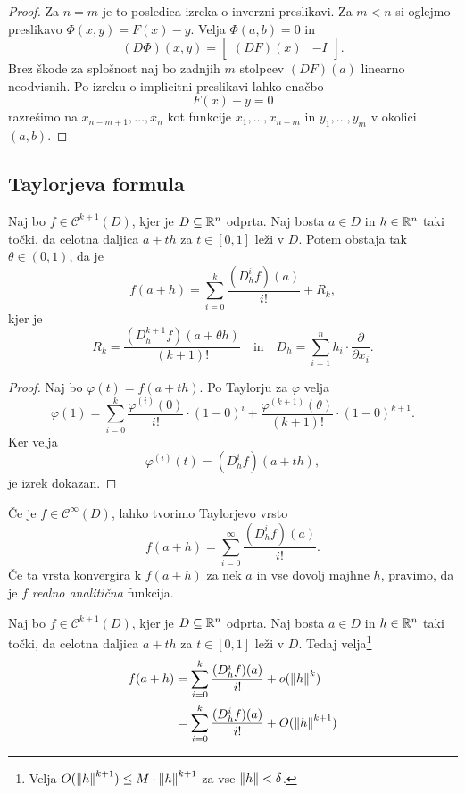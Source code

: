 \begin{proof}
Za $n=m$ je to posledica izreka o inverzni preslikavi. Za $m < n$
si oglejmo preslikavo $\Phi(x,y) = F(x) - y$. Velja $\Phi(a,b)=0$
in
\[
(D\Phi)(x,y) =
\begin{bmatrix}
(DF)(x) & -I
\end{bmatrix}.
\]
Brez škode za splošnost naj bo zadnjih $m$ stolpcev $(DF)(a)$
linearno neodvisnih. Po izreku o implicitni preslikavi lahko enačbo
\[
F(x) - y = 0
\]
razrešimo na $x_{n-m+1},\dots,x_n$ kot funkcije $x_1,\dots,x_{n-m}$
in $y_1,\dots,y_m$ v okolici $(a,b)$.
\end{proof}

\newpage

\subsection{Taylorjeva formula}

\begin{izrek}
Naj bo $f \in \mathcal{C}^{k+1}(D)$, kjer je $D \subseteq \mathbb{R}^n$
odprta. Naj bosta $a \in D$ in $h \in \mathbb{R}^n$ taki točki, da celotna
daljica $a+th$ za $t \in [0,1]$ leži v $D$. Potem obstaja tak
$\theta \in (0,1)$, da je
\[
f(a+h) = \sum_{i=0}^k \frac{(D_h^if)(a)}{i!} + R_k,
\]
kjer je
\[
R_k = \frac{(D_h^{k+1}f)(a + \theta h)}{(k+1)!}
\quad \text{in} \quad
D_h = \sum_{i=1}^n h_i \cdot \frac{\partial}{\partial x_i}.
\]
\end{izrek}

\begin{proof}
Naj bo $\varphi(t) = f(a + th)$. Po Taylorju za $\varphi$ velja
\[
\varphi(1) = \sum_{i=0}^k \frac{\varphi^{(i)}(0)}{i!} \cdot(1-0)^i
+ \frac{\varphi^{(k+1)}(\theta)}{(k+1)!} \cdot (1-0)^{k+1}.
\]
Ker velja
\[
\varphi^{(i)}(t) = (D_h^if)(a+th),
\]
je izrek dokazan.
\end{proof}

\begin{opomba}
Če je $f \in \mathcal{C}^\infty(D)$, lahko tvorimo Taylorjevo vrsto
\[
f(a+h) = \sum_{i=0}^\infty \frac{(D_h^if)(a)}{i!}.
\]
Če ta vrsta konvergira k $f(a+h)$ za nek $a$ in vse dovolj majhne
$h$, pravimo, da je $f$
\emph{realno analitična} funkcija.
\end{opomba}

\begin{posledica}
Naj bo $f \in \mathcal{C}^{k+1}(D)$, kjer je $D \subseteq \mathbb{R}^n$
odprta. Naj bosta $a \in D$ in $h \in \mathbb{R}^n$ taki točki, da celotna
daljica $a+th$ za $t \in [0,1]$ leži v $D$. Tedaj velja\footnote{
Velja $O(\left\lVert h\right\rVert^{k+1}) \leq M \cdot \left\lVert h\right\rVert^{k+1}$ za vse
$\left\lVert h\right\rVert < \delta$.}
\begin{align*}
f(a+h) &= \sum_{i=0}^k \frac{(D_h^if)(a)}{i!} + o(\left\lVert h\right\rVert^k)
\\
&= \sum_{i=0}^k \frac{(D_h^if)(a)}{i!} + O(\left\lVert h\right\rVert^{k+1})
\end{align*}
\end{posledica}


